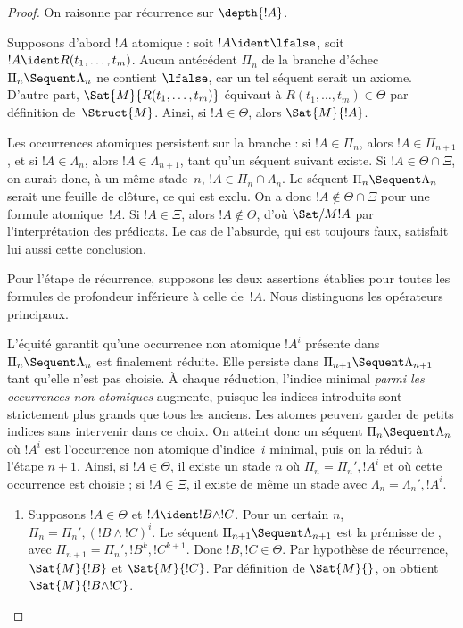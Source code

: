 \documentclass[../../../include/open-logic-section]{subfiles}
\begin{document}
\begin{proof}
On raisonne par récurrence sur $\depth{!A}$.

Supposons d'abord $!A$ atomique : soit
$!A \ident \lfalse$, soit $!A \ident R(t_1, \dots, t_m)$.
Aucun antécédent $\Pi_n$ de la branche d'échec
$\Pi_n \Sequent \Lambda_n$ ne contient $\lfalse$,
car un tel séquent serait un axiome.
D'autre part, $\Sat{M}{R(t_1, \dots, t_m)}$ équivaut
à $R(t_1, \dots, t_m) \in \Theta$ par définition
de~$\Struct{M}$. Ainsi, si $!A \in \Theta$,
alors $\Sat{M}{!A}$.

Les occurrences atomiques persistent sur la branche :
si $!A \in \Pi_n$, alors $!A \in \Pi_{n+1}$,
et si $!A \in \Lambda_n$, alors $!A \in \Lambda_{n+1}$,
tant qu'un séquent suivant existe.
Si $!A \in \Theta \cap \Xi$, on aurait donc,
à un même stade~$n$, $!A \in \Pi_n \cap \Lambda_n$.
Le séquent $\Pi_n \Sequent \Lambda_n$ serait
une feuille de clôture, ce qui est exclu.
On a donc $!A \notin \Theta \cap \Xi$
pour une formule atomique~$!A$. Si $!A \in \Xi$, alors
$!A \notin \Theta$, d'où $\Sat/{M}{!A}$
par l'interprétation des prédicats.
Le cas de l'absurde, qui est toujours faux,
satisfait lui aussi cette conclusion.

Pour l'étape de récurrence, supposons les deux
assertions établies pour toutes les formules
de profondeur inférieure à celle de~$!A$.
Nous distinguons les opérateurs principaux.

L'équité garantit qu'une occurrence non atomique
$!A^i$ présente dans $\Pi_n \Sequent \Lambda_n$
est finalement réduite. Elle persiste dans
$\Pi_{n+1} \Sequent \Lambda_{n+1}$ tant qu'elle
n'est pas choisie. À chaque réduction, l'indice
minimal \emph{parmi les occurrences non atomiques}
augmente, puisque les indices introduits sont
strictement plus grands que tous les anciens.
Les atomes peuvent garder de petits indices
sans intervenir dans ce choix. On atteint donc
un séquent $\Pi_n \Sequent \Lambda_n$ où $!A^i$
est l'occurrence non atomique d'indice~$i$ minimal,
puis on la réduit à l'étape $n+1$.
Ainsi, si $!A \in \Theta$, il existe un stade $n$
où $\Pi_n = \Pi_n', !A^i$ et où cette occurrence
est choisie ; si $!A \in \Xi$, il existe de même
un stade avec $\Lambda_n = \Lambda_n', !A^i$.

\begin{enumerate}
  \item Supposons $!A \in \Theta$ et
  $!A \ident !B \land !C$. Pour un certain $n$,
  $\Pi_n = \Pi_n', (!B \land !C)^i$.
  Le séquent $\Pi_{n+1} \Sequent \Lambda_{n+1}$
  est la prémisse de \LeftR{\land}, avec
  $\Pi_{n+1} = \Pi_n', !B^k, !C^{k+1}$.
  Donc $!B, !C \in \Theta$.
  Par hypothèse de récurrence, $\Sat{M}{!B}$
  et $\Sat{M}{!C}$. Par définition de
  $\Sat{M}{}$, on obtient $\Sat{M}{!B \land !C}$.


\end{enumerate}
\end{proof}
\end{document}
